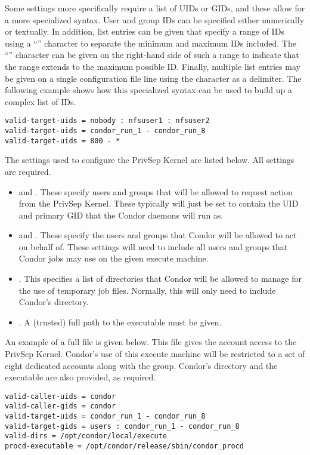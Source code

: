Some settings more specifically require a list of UIDs or GIDs, and
these allow for a more specialized syntax. User and group IDs can be
specified either numerically or textually. In addition, list entries
can be given that specify a range of IDs using a ``\Code{-}''
character to separate the minimum and maximum IDs included. The
``\Code{*}'' character can be given on the right-hand side of such a
range to indicate that the range extends to the maximum possible
ID. Finally, multiple list entries may be given on a single
configuration file line using the \Code{:} character as a
delimiter. The following example shows how this specialized syntax can
be used to build up a complex list of IDs.
\begin{verbatim}
valid-target-uids = nobody : nfsuser1 : nfsuser2
valid-target-uids = condor_run_1 - condor_run_8
valid-target-uids = 800 - *
\end{verbatim}

The settings used to configure the PrivSep Kernel are listed
below. All settings are required.

\begin{itemize}

\item {} and . These
specify users and groups that will be allowed to request action from
the PrivSep Kernel. These typically will just be set to contain the
UID and primary GID that the Condor daemons will run as.

\item {} and . These
specify the users and groups that Condor will be allowed to act on
behalf of. These settings will need to include all users and groups
that Condor jobs may use on the given execute machine.

\item {}. This specifies a list of directories that
Condor will be allowed to manage for the use of temporary job
files. Normally, this will only need to include Condor's
 directory.

\item {}. A (trusted) full path to the
 executable must be given.

\end{itemize}

An example of a full  file is given below. This
file gives the  account access to the PrivSep
Kernel. Condor's use of this execute machine will be restricted to a
set of eight dedicated accounts along with the 
group. Condor's  directory and the 
executable are also provided, as required.
\begin{verbatim}
valid-caller-uids = condor
valid-caller-gids = condor
valid-target-uids = condor_run_1 - condor_run_8
valid-target-gids = users : condor_run_1 - condor_run_8
valid-dirs = /opt/condor/local/execute
procd-executable = /opt/condor/release/sbin/condor_procd
\end{verbatim}

